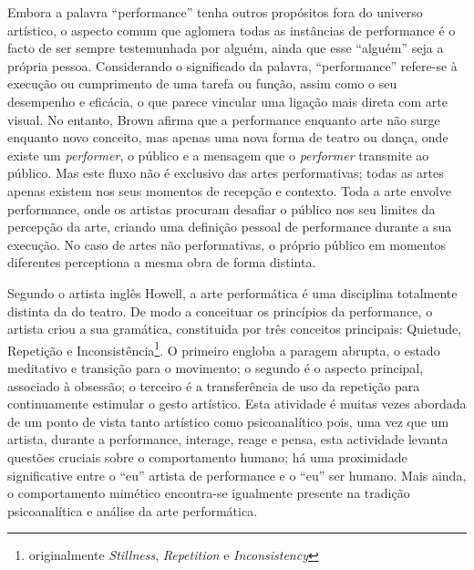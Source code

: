 \documentclass[../main.tex]{subfiles}
\begin{document}
Embora a palavra \enquote{performance} tenha outros propósitos fora do universo artístico, o aspecto comum que aglomera todas as instâncias de performance é o facto de ser sempre testemunhada por alguém, ainda que esse \enquote{alguém} seja a própria pessoa\cite{carlson1996}. Considerando o significado da palavra, \enquote{performance} refere-se à execução ou cumprimento de uma tarefa ou função, assim como o seu desempenho e eficácia\cite{oxford}, o que parece vincular uma ligação mais direta com arte visual\cite{brisley}. No entanto, Brown afirma que a performance enquanto arte não surge enquanto novo conceito, mas apenas uma nova forma de teatro ou dança, onde existe um \textsl{performer}, o público e a mensagem que o \textsl{performer} transmite ao público\cite{brown_battcock}. Mas este fluxo não é exclusivo das artes performativas; todas as artes apenas existem nos seus momentos de recepção e contexto\cite{gadamer}. Toda a arte envolve performance\cite{brisley}, onde os artistas procuram desafiar o público nos seu limites da percepção da arte, criando uma definição pessoal de performance durante a sua execução\cite{goldberg_battcock}. No caso de artes não performativas, o próprio público em momentos diferentes perceptiona a mesma obra de forma distinta\cite{gadamer}.

Segundo o artista inglês Howell, a arte performática é uma disciplina totalmente distinta da do teatro\cite{howell1999}. De modo a conceituar os princípios da performance, o artista criou a sua gramática, constituida por três conceitos principais: Quietude, Repetição e Inconsistência\footnote{originalmente \textit{Stillness}, \textit{Repetition} e \textit{Inconsistency}}. O primeiro engloba a paragem abrupta, o estado meditativo e transição para o movimento; o segundo é o aspecto principal, associado à obsessão; o terceiro é a transferência de uso da repetição para continuamente estimular o gesto artístico. Esta atividade é muitas vezes abordada de um ponto de vista tanto artístico como psicoanalítico pois, uma vez que um artista, durante a performance, interage, reage e pensa, esta actividade levanta questões cruciais sobre o comportamento humano\cite{kear}; há uma proximidade significative entre o \enquote{eu} artista de performance e o \enquote{eu} ser humano\cite{carlson1996}. Mais ainda, o comportamento mimético encontra-se igualmente presente na tradição psicoanalítica e análise da arte performática\cite{howell1999,read}.

\end{document}
